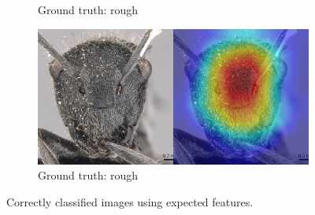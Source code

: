 \documentclass{aci}
\numberwithin{equation}{section}
\begin{document}
\begin{figure}
\begin{subfigure}{\subwidth}
        \caption{Ground truth: rough}
        \label{fig:correct_ideal_842}
    \end{subfigure}
    \begin{subfigure}{\subwidth}
        \includegraphics[width=1\linewidth]{thesis_assets/gradcam/correct_ideal/1091.png}
        \caption{Ground truth: rough}
        \label{fig:correct_ideal_1091}
    \end{subfigure}
    \caption{Correctly classified images using expected features.}
    \label{fig:correct_ideal}
\end{figure}
\end{document}
